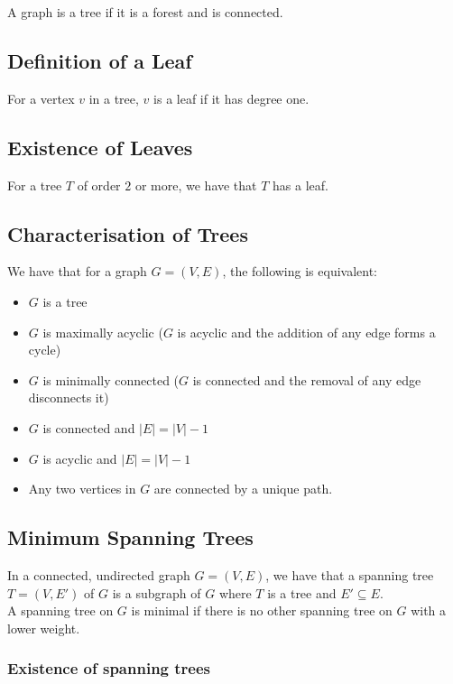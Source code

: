 \documentclass[a4paper, 12pt, twoside]{article}
\begin{document}
A graph is a tree if it is a forest and is connected.

\subsection{Definition of a Leaf}

For a vertex $v$ in a tree, $v$ is a leaf if it has degree one.

\subsection{Existence of Leaves}

For a tree $T$ of order $2$ or more, we have that $T$ has a leaf.

\subsection{Characterisation of Trees}

We have that for a graph $G = (V, E)$, the following is equivalent:
\begin{itemize}
  \item $G$ is a tree
  \item $G$ is maximally acyclic ($G$ is acyclic and the addition
  of any edge forms a cycle)
  \item $G$ is minimally connected ($G$ is connected and the removal
  of any edge disconnects it)
  \item $G$ is connected and $|E| = |V| - 1$
  \item $G$ is acyclic and $|E| = |V| - 1$
  \item Any two vertices in $G$ are connected by a unique path.
\end{itemize}

\subsection{Minimum Spanning Trees}

In a connected, undirected graph $G = (V, E)$, we have that a
spanning tree $T = (V, E')$ of $G$ is a subgraph of $G$ where
$T$ is a tree and $E' \subseteq E$.
\\[\baselineskip]
A spanning tree on $G$ is minimal if there is no other spanning tree
on $G$ with a lower weight.

\subsubsection{Existence of spanning trees}
\end{document}
